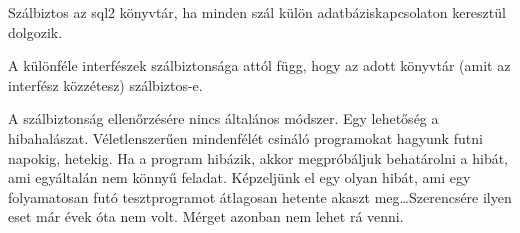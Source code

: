 Szálbiztos az sql2 könyvtár, 
ha minden szál külön adatbáziskapcsolaton keresztül dolgozik.

A különféle interfészek szálbiztonsága attól függ,
hogy az adott könyvtár (amit az interfész közzétesz) szálbiztos-e.

A szálbiztonság ellenőrzésére nincs általános módszer.
Egy lehetőség a hibahalászat. Véletlenszerűen mindenfélét csináló programokat
hagyunk futni napokig, hetekig. Ha a program hibázik, akkor megpróbáljuk
behatárolni a hibát, ami egyáltalán nem könnyű feladat.
Képzeljünk el egy olyan hibát, ami egy folyamatosan futó tesztprogramot
átlagosan  hetente akaszt meg\ldots Szerencsére ilyen eset már évek óta
nem volt. Mérget azonban nem lehet rá venni. 


\begin{comment}
Ez nem aktuális, ki lett javítva.


A hibahalászós módszerrel találtam a következő érdekes (nem könnyen kijavítható) 
hibát, amivel mégiscsak el lehet rontani a szemétgyűjtést alkalmazásszinten is.
Az alábbi program az én rendszeremen pár másodpercen belül SIGSEGV-vel elszáll.
\begin{verbatim}
function main()
    thread_create({||dothread()})
    while(.t.)
        array(100)[1]:=1
    end

function dothread()
    while(.t.)
        gc()      // szemetet gyűjt
        sleep(1)  // 1 ezredmásodpercet alszik
    end
\end{verbatim}
A program elindít egy szálat, ami lényegében folyamatosan gyűjti a szemetet 
\verb!gc()!-vel. Általában nincs értelme indítgatni a szemétgyűjtést,
elindul az magától, amikor kell, most azonban a hiba kimutatása a cél.
Az eredeti szál közben ezt ismételgeti:
\begin{verbatim}
    array(100)[1]:=1
\end{verbatim}
És itt a baj. Ui. az \verb!array()!-ből kapott tömb
nem értéke egyetlen programváltozónak sem,
és a függvény visszatérése után rögtön lekerül a stackről.
Csak ezután próbál a program értéket adni a tömbelemnek.
Az időzítéstől függően azonban egyes esetekben a tömböt már eltakarította
a szemétgyűjtés, a program a semmibe nyúl\ldots
Az a szerencse, hogy értelmetlen. Miért akarnánk
értéket adni egy nemlétező tömb akármelyik elemének?
Ha a programnak értelmet adunk, pl.
\begin{verbatim}
    a:=array(100)
    a[1]:=1
\end{verbatim}
akkor viszont a hiba is rögtön megszűnik.
Csak játék, de mutatja, milyen könnyű elrontani a szálbiztonságot,
és milyen rejtvényszerű hibákat kell néha felderíteni.

\end{comment}







